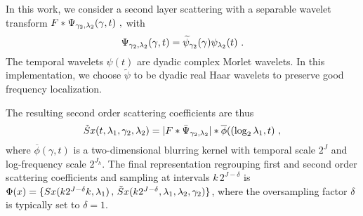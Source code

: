 In this work, we consider a second layer scattering with 
a separable wavelet transform $F \ast \Psi_{\gamma_2, {\lambda}_2} (\gamma, t)~,$
with
$$\Psi_{{\gamma_2}, {{\lambda}_2}}(\gamma,t) = \widetilde{\psi}_{\gamma_2}(\gamma) \psi_{{\lambda}_2}(t)~.$$
The temporal wavelets $\psi(t)$ are dyadic complex Morlet wavelets. 
In this implementation, 
we choose $\widetilde{\psi}$ to be dyadic real Haar wavelets to preserve good frequency localization.

The resulting second order scattering coefficients are thus
\[
\tilde{S} x (t, {\lambda}_1, \gamma_2,  {\lambda}_2) = 
 |F \ast \bar \Psi_{\gamma_2, {\lambda}_2} | \ast \overline{\phi}( (\log_2 {\lambda}_1, t)~,
\]
where $\overline{\phi}(\gamma, t)$ is a two-dimensional blurring kernel with temporal 
scale $2^J$ and log-frequency scale $2^{J_h}$.
 The final representation regrouping first and second order scattering
coefficients and sampling at intervals $k\,2^{J-\delta}$
is $\Phi(x) = \{ Sx(k 2^{J-\delta} k,{\lambda}_1)\,,\, \tilde{S}x(k 2^{J-\delta} ,{\lambda}_1,{\lambda}_2,\gamma_2)\} $, 
where the oversampling factor $\delta$ is typically set to $\delta=1$.


%
%
%
%
%
%
